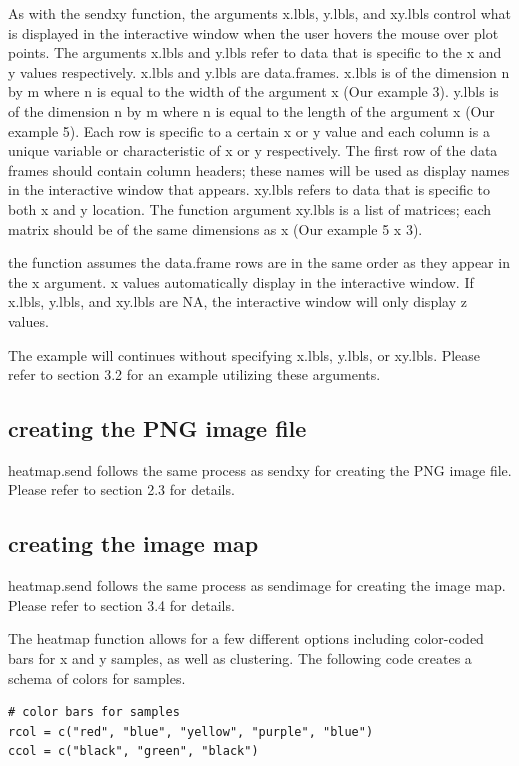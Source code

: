 \documentclass[]{article}
\begin{document}
\indent As with the sendxy function, the arguments x.lbls, y.lbls, and xy.lbls control what is displayed in the interactive window when the user hovers the mouse over plot points. The arguments x.lbls and y.lbls refer to data that is specific to the x and y values respectively. x.lbls and y.lbls are data.frames. x.lbls is of the dimension n by m where n is equal to the width of the argument x (Our example 3). y.lbls is of the dimension n by m where n is equal to the length of the argument x (Our example 5). Each row is specific to a certain x or y value and each column is a unique variable or characteristic of x or y respectively.  The first row of the data frames should contain column headers; these names will be used as display names in the interactive window that appears. xy.lbls refers to data that is specific to both x and y location. The function argument xy.lbls is a list of matrices; each matrix should be of the same dimensions as x (Our example 5 x 3).

 the function assumes the data.frame rows are in the same order as they appear in the x argument.  \newline
{} x values automatically display in the interactive window. If x.lbls, y.lbls, and xy.lbls are NA, the interactive window will only display z values. \newline

\indent The example will continues without specifying x.lbls, y.lbls, or xy.lbls. Please refer to section 3.2 for an example utilizing these arguments. 


\subsection{creating the PNG image file}

\indent heatmap.send follows the same process as sendxy for creating the PNG image file. Please refer to section 2.3 for details.

\subsection{creating the image map}

\indent heatmap.send follows the same process as sendimage for creating the image map. Please refer to section 3.4 for details.


\indent The heatmap function allows for a few different options including color-coded bars for x and y samples, as well as clustering. The following code creates a schema of colors for samples. 
\begin{verbatim}
# color bars for samples
rcol = c("red", "blue", "yellow", "purple", "blue")
ccol = c("black", "green", "black")
\end{verbatim}
\end{document}
